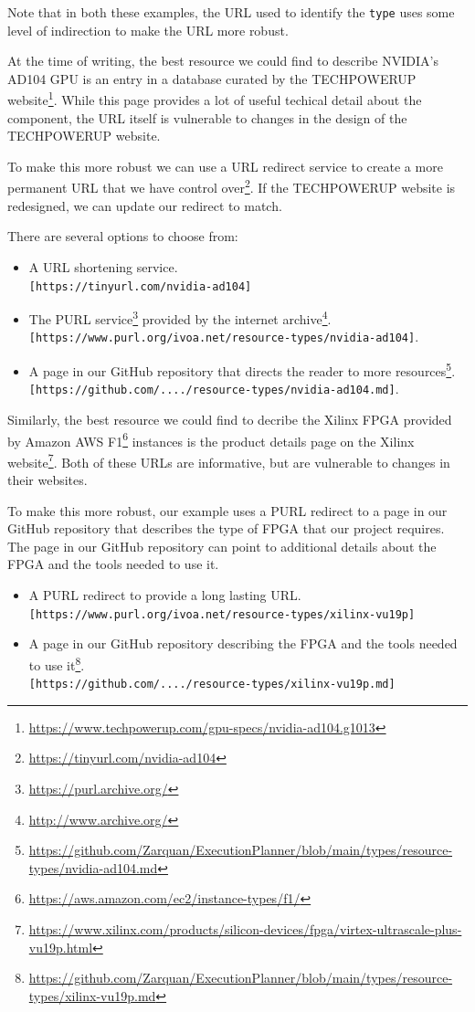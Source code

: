 \documentclass[11pt,a4paper]{ivoa}
\newcommand{\codeword}[1] {\texttt{#1}}
\newcommand{\footurl}[1] {\footnote{\url{#1}}}
\begin{document}
Note that in both these examples, the URL used to identify the \codeword{type}
uses some level of indirection to make the URL more robust.

At the time of writing, the best resource we could find to describe NVIDIA's AD104 GPU
is an entry in a database curated by the TECHPOWERUP
website\footurl{https://www.techpowerup.com/gpu-specs/nvidia-ad104.g1013}.
While this page provides a lot of useful techical detail about the component,
the URL itself is vulnerable to changes in the design of the TECHPOWERUP website.

To make this more robust we can use a URL redirect service to create a more permanent
URL that we have control over\footurl{https://tinyurl.com/nvidia-ad104}.
If the TECHPOWERUP website is redesigned, we can update
our redirect to match.

There are several options to choose from:
\begin{itemize}
\item A URL shortening service.\\
      \codeword{[https://tinyurl.com/nvidia-ad104]}
\item The PURL service\footurl{https://purl.archive.org/} provided by the internet archive\footurl{http://www.archive.org/}.\\
      \codeword{[https://www.purl.org/ivoa.net/resource-types/nvidia-ad104]}.
\item A page in our GitHub repository that directs the reader to more resources\footurl{https://github.com/Zarquan/ExecutionPlanner/blob/main/types/resource-types/nvidia-ad104.md}.\\
      \codeword{[https://github.com/..../resource-types/nvidia-ad104.md]}.
\end{itemize}

Similarly, the best resource we could find to decribe the Xilinx FPGA provided by Amazon AWS
F1\footurl{https://aws.amazon.com/ec2/instance-types/f1/} instances is the product details
page on the Xilinx website\footurl{https://www.xilinx.com/products/silicon-devices/fpga/virtex-ultrascale-plus-vu19p.html}.
Both of these URLs are informative, but are vulnerable to changes in their websites.

To make this more robust, our example uses a PURL redirect to a page in our GitHub repository that describes
the type of FPGA that our project requires. The page in our GitHub repository can point to additional details about the
FPGA and the tools needed to use it.
\begin{itemize}
\item A PURL redirect to provide a long lasting URL.\\
      \codeword{[https://www.purl.org/ivoa.net/resource-types/xilinx-vu19p]}
\item A page in our GitHub repository describing the FPGA and the tools needed to use it\footurl{https://github.com/Zarquan/ExecutionPlanner/blob/main/types/resource-types/xilinx-vu19p.md}.\\
      \codeword{[https://github.com/..../resource-types/xilinx-vu19p.md]}
\end{itemize}
\end{document}
